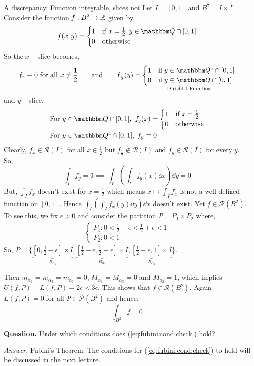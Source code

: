 \documentclass[../Analysis-3.tex]{subfiles}
\begin{document}
\begin{Eg}{A discrepancy: Function integrable, slices not}{}
  Let $ I = [0,1] $ and $ B^2 = I \times I $. Consider the function $ f:B^2 \to \mathbb{R} $ given by,
  \[  f(x,y) = \begin{cases}
      1 & \text{if } x = \frac 12, y \in \Q \cap [0,1] \\
      0 & \text{otherwise}
    \end{cases}  \]
  So the $x-$slice becomes,
  \[  f_x \equiv 0 \text{ for all } x \neq \frac 12 \qquad \text{and} \qquad f_{\frac 12}(y) = \underset{\text{Dirichlet Function}}{\begin{cases}
        1 & \text{if } y \in \Q^c \cap [0,1] \\
        0 & \text{if } y \in \Q \cap [0,1]
      \end{cases}} \]
  and $y-$slice,
  \begin{align*}
     & \text{For } y \in \Q \cap [0,1], \ f_y(x) = \begin{cases}
                                                     1 & \text{if } x = \frac 12 \\
                                                     0 & \text{otherwise}
                                                   \end{cases} \\
     & \text{For } y \in \Q^c \cap [0,1], \ f_y \equiv 0
  \end{align*}
  Clearly, $ f_x \in \mathscr{R}(I) $ for all $ x \in \frac 12 $ but $ f_{\frac 12} \not\in \mathscr{R}(I) $ and $ f_y \in \mathscr{R}(I) $ for every $ y $. So,
  \[  \int_I f_y = 0 \implies \int_I \left( \int_I f_y(x) \dd x \right) \dd y = 0 \]
  But, $ \displaystyle\int_I f_x $ doesn't exist for $ x = \frac 12 $ which means $ \displaystyle x \longmapsto \int_I f_x $ is not a well-defined function on $ [0,1] $. Hence $ \displaystyle\int_I \left( \int_I f_x(y) \dd y \right) \dd x $ doesn't exist. Yet $ f \in \mathscr{R}(B^2) $. To see this, we fix $ \epsilon > 0 $ and consider the partition $ P = P_1 \times P_2 $ where,
  \begin{align*}
    \begin{cases}
      P_1: 0 < \frac 12 - \epsilon < \frac 12 + \epsilon < 1 \\
      P_2: 0 < 1
    \end{cases}
  \end{align*}
  So, $ P = \Bigg\{ \underbrace{\left[ 0, \frac 12 - \epsilon \right] \times I}_{B_{\alpha_1}}, \underbrace{\left[\frac 12 - \epsilon, \frac 12 + \epsilon \right] \times I}_{B_{\alpha_2}}, \underbrace{\left[\frac 12 - \epsilon, 1 \right] \times I}_{B_{\alpha_3}} \Bigg\} $.

  Then $ m_{\alpha_1} = m_{\alpha_{2}} = m_{\alpha_3} = 0 $, $ M_{\alpha_1} = M_{\alpha_3} = 0 $ and $ M_{\alpha_2} = 1 $, which implies $ U(f,P) - L(f,P) = 2\epsilon < 3\epsilon $. This shows that $ f \in \mathscr{R}(B^2) $. Again $ L(f,P) = 0 $ for all $ P \in \mathscr{P}(B^2) $ and hence,
  \[  \int_{B^2} f = 0  \]
\end{Eg}

\textbf{Question.} Under which conditions does (\ref{eq:fubini:cond:check}) hold?

\textit{Answer.} Fubini's Theorem. The conditions for (\ref{eq:fubini:cond:check}) to hold will be discussed in the next lecture.
\end{document}
